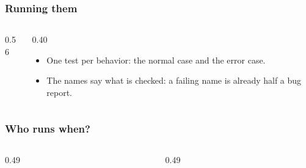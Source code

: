 \documentclass[aspectratio=169,10pt,compress]{beamer}
\begin{document}
\begin{frame}[t,fragile] \frametitle{Running them}
  \begin{columns}[T]
    \begin{column}{0.56\textwidth}
    \end{column}
    \begin{column}{0.40\textwidth}
      \begin{itemize}\small
        \item One test per behavior: the normal case and the error case.
        \item The names say what is checked: a failing name is already half a bug report.
      \end{itemize}
    \end{column}
  \end{columns}
\end{frame}





\begin{frame}[t,fragile] \frametitle{Who runs when?}
  \begin{columns}[T]
    \begin{column}{0.49\textwidth}
    \end{column}
    \begin{column}{0.49\textwidth}
    \end{column}
  \end{columns}
\end{frame}
\end{document}
